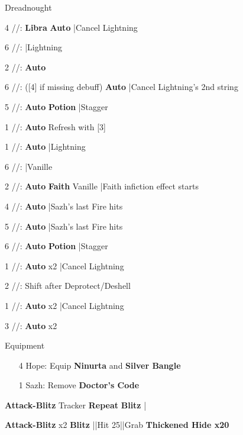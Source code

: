 \begin{fight}{Dreadnought}
	\item [4] \rav/\rav/\sab: \textbf{Libra} \to \textbf{Auto} |Cancel Lightning
	\item [6] \rav/\rav/\rav: |Lightning
	\item [2] \syn/\com/\sab: \textbf{Auto}
	\item [6] \rav/\rav/\rav: ([4] if missing debuff) \textbf{Auto}
	|Cancel Lightning's 2nd string
	\item [5] \rav/\rav/\rav: \textbf{Auto} \to \textbf{Potion}
	|Stagger
	\item [1] \rav/\com/\rav: \textbf{Auto} \to Refresh with [3]
	\item \skip
	\item [1] \rav/\com/\rav: \textbf{Auto} |Lightning
	\item [6] \rav/\rav/\rav: |Vanille
	\item [2] \syn/\com/\sab: \textbf{Auto} \to \textbf{Faith} Vanille |Faith infiction effect starts
	\item [4] \rav/\rav/\sab: \textbf{Auto} |Sazh's last Fire hits
	\item [5] \rav/\rav/\rav: \textbf{Auto} |Sazh's last Fire hits
	\item [6] \rav/\rav/\rav: \textbf{Auto} \to \textbf{Potion} |Stagger
	\item [1] \rav/\com/\rav: \textbf{Auto} x2 |Cancel Lightning
	\item [2] \syn/\com/\sab: Shift after Deprotect/Deshell
	\item [1] \rav/\com/\rav: \textbf{Auto} x2 |Cancel Lightning
	\item [3] \rav/\com/\rav: \textbf{Auto} x2
	\item \skip
\end{fight}

\begin{menu}
	\item Equipment
	\begin{itemize}
		\item [4] Hope: Equip \textbf{Ninurta} and \textbf{Silver Bangle}
		\item [1] Sazh: Remove \textbf{Doctor's Code}
	\end{itemize}
\end{menu}

\begin{mainlist}
	\item {}
	\item {}\textbf{Attack-Blitz} Tracker \to
	[2] \textbf{Repeat} \to \textbf{Blitz} |
	\item \skip
	\item {} \textbf{Attack-Blitz} x2 \to
	\textbf{Blitz} |\skip|Hit 25|\skip|Grab \textbf{Thickened Hide x20}
\end{mainlist}

